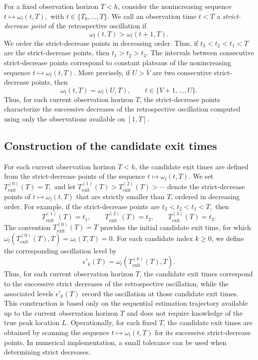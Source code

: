 \documentclass[12pt,a4paper]{article}
\begin{document}
For a fixed observation horizon \(T<h\), consider the nonincreasing sequence
$t\longmapsto\omega_l(t,T),$
with 
$t\in\{T_0,\ldots,T\}.$
We call an observation time \(t<T\) a \emph{strict-decrease point} of the retrospective oscillation if
\[
\omega_l(t,T)>\omega_l(t+1,T).
\]
We order the strict-decrease points in decreasing order. Thus, if
\(
t_3<t_2<t_1<T
\)
are the strict-decrease points, then
\(
t_1>t_2>t_3.
\)
The intervals between consecutive strict-decrease points correspond to constant plateaus of the nonincreasing sequence \(t\mapsto\omega_l(t,T)\). More precisely, if \(U>V\) are two consecutive strict-decrease points, then
\[
\omega_l(t,T)=\omega_l(U,T),
\qquad
t\in\{V+1,\ldots,U\}.
\]
Thus, for each current observation horizon \(T\), the strict-decrease points characterize the successive decreases of the retrospective oscillation computed using only the observations available on \([1,T]\).

\subsection{Construction of the candidate exit times}
\label{subsec:candidate-exit-times}

For each current observation horizon \(T<h\), the candidate exit times are defined from the strict-decrease points of the sequence
\(
t\longmapsto\omega_l(t,T).
\)
We set
\(
T_{\mathrm{exit}}^{(0)}(T)=T,
\)
and let
\(
T_{\mathrm{exit}}^{(1)}(T)>
T_{\mathrm{exit}}^{(2)}(T)>
\cdots
\)
denote the strict-decrease points of \(t\mapsto\omega_l(t,T)\) that are strictly smaller than \(T\), ordered in decreasing order.
For example, if the strict-decrease points are
\(
t_3<t_2<t_1<T,
\)
then
\[
T_{\mathrm{exit}}^{(1)}(T)=t_1,\qquad
T_{\mathrm{exit}}^{(2)}(T)=t_2,\qquad
T_{\mathrm{exit}}^{(3)}(T)=t_3.
\]
The convention
\(
T_{\mathrm{exit}}^{(0)}(T)=T
\)
provides the initial candidate exit time, for which
\(
\omega_l\left(T_{\mathrm{exit}}^{(0)}(T),T\right)
=
\omega_l(T,T)
=
0.
\)
For each candidate index \(k\geq0\), we define the corresponding oscillation level by
\[
\epsilon'_k(T)
=
\omega_l\left(
T_{\mathrm{exit}}^{(k)}(T),T
\right).
\]
Thus, for each current observation horizon \(T\), the candidate exit times correspond to the successive strict decreases of the retrospective oscillation, while the associated levels \(\epsilon'_k(T)\) record the oscillation at those candidate exit times.
This construction is based only on the sequential estimation trajectory available up to the current observation horizon \(T\) and does not require knowledge of the true peak location \(L\). Operationally, for each fixed \(T\), the candidate exit times are obtained by scanning the sequence
\(
t\longmapsto\omega_l(t,T)
\)
for its successive strict-decrease points. In numerical implementation, a small tolerance can be used when determining strict decreases.
\end{document}

